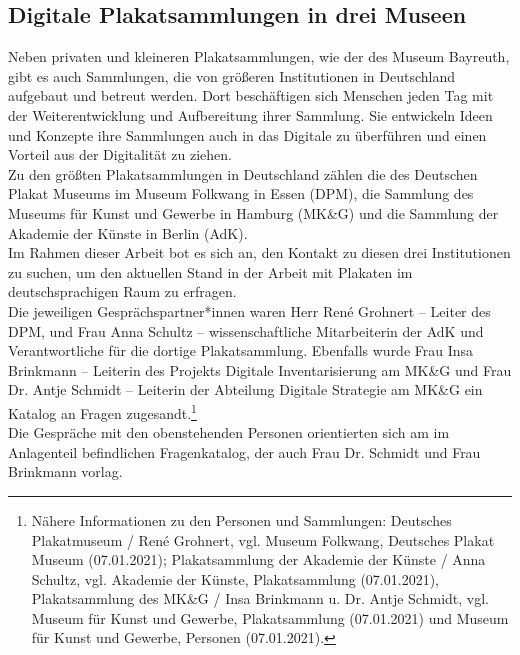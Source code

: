 \documentclass[a4paper,12pt,ngerman]{article}
\begin{document}
\subsection{Digitale Plakatsammlungen in drei Museen}
Neben privaten und kleineren Plakatsammlungen, wie der des Museum Bayreuth, gibt es auch Sammlungen, die von größeren Institutionen in Deutschland aufgebaut und betreut werden. Dort beschäftigen sich Menschen jeden Tag mit der Weiterentwicklung und Aufbereitung ihrer Sammlung. Sie entwickeln Ideen und Konzepte ihre Sammlungen auch in das Digitale zu überführen und einen Vorteil aus der Digitalität zu ziehen. \\
Zu den größten Plakatsammlungen in Deutschland zählen die des Deutschen Plakat Museums im Museum Folkwang in Essen (DPM), die Sammlung des Museums für Kunst und Gewerbe in Hamburg (MK\&G) und die Sammlung der Akademie der Künste in Berlin (AdK). \\
Im Rahmen dieser Arbeit bot es sich an, den Kontakt zu diesen drei Institutionen zu suchen, um den aktuellen Stand in der Arbeit mit Plakaten im deutschsprachigen Raum zu erfragen. \\
Die jeweiligen Gesprächspartner*innen waren Herr René Grohnert – Leiter des DPM, und Frau Anna Schultz – wissenschaftliche Mitarbeiterin der AdK und Verantwortliche für die dortige Plakatsammlung. Ebenfalls wurde Frau Insa Brinkmann – Leiterin des Projekts Digitale Inventarisierung am MK\&G und Frau Dr. Antje Schmidt – Leiterin der Abteilung Digitale Strategie am MK\&G ein Katalog an Fragen zugesandt.\footnote{Nähere Informationen zu den Personen und Sammlungen: Deutsches Plakatmuseum / René Grohnert, vgl. Museum Folkwang, Deutsches Plakat Museum (07.01.2021); Plakatsammlung der Akademie der Künste / Anna Schultz, vgl. Akademie der Künste, Plakatsammlung (07.01.2021), Plakatsammlung des MK\&G / Insa Brinkmann u. Dr. Antje Schmidt, vgl. Museum für Kunst und Gewerbe, Plakatsammlung (07.01.2021) und Museum für Kunst und Gewerbe, Personen (07.01.2021).} \\
Die Gespräche mit den obenstehenden Personen orientierten sich am im Anlagenteil befindlichen Fragenkatalog, der auch Frau Dr. Schmidt und Frau Brinkmann vorlag. \\
\end{document}
